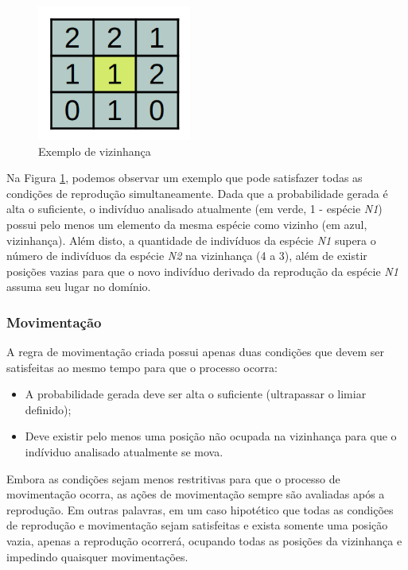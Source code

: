 \documentclass[a4paper, 12pt]{article}
\begin{document}
\begin{figure}[H]
    \centering
    \includegraphics[width=0.45\textwidth]{Images/Exercise 7/grid.png}
    \caption{Exemplo de vizinhança}
    \label{fig:map1}
\end{figure}

Na Figura \ref{fig:map1}, podemos observar um exemplo que pode satisfazer todas as condições de reprodução simultaneamente. Dada que a probabilidade gerada é alta o suficiente, o indivíduo analisado atualmente (em verde, 1 - espécie \emph{N1}) possui pelo menos um elemento da mesma espécie como vizinho (em azul, vizinhança). Além disto, a quantidade de indivíduos da espécie \emph{N1} supera o número de indivíduos da espécie \emph{N2} na vizinhança (4 a 3), além de existir posições vazias para que o novo indivíduo derivado da reprodução da espécie \emph{N1} assuma seu lugar no domínio.

\subsubsection*{Movimentação}

A regra de movimentação criada possui apenas duas condições que devem ser satisfeitas ao mesmo tempo para que o processo ocorra:

\begin{itemize}
    \item A probabilidade gerada deve ser alta o suficiente (ultrapassar o limiar definido);
    \item Deve existir pelo menos uma posição não ocupada na vizinhança para que o indíviduo analisado atualmente se mova.
\end{itemize}

Embora as condições sejam menos restritivas para que o processo de movimentação ocorra, as ações de movimentação sempre são avaliadas após a reprodução. Em outras palavras, em um caso hipotético que todas as condições de reprodução e movimentação sejam satisfeitas e exista somente uma posição vazia, apenas a reprodução ocorrerá, ocupando todas as posições da vizinhança e impedindo quaisquer movimentações. 
\end{document}
